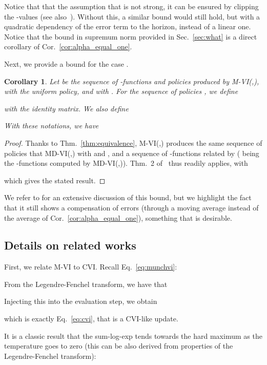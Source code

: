 \documentclass{article}
\newtheorem{cor}{Corollary}
\begin{document}
Notice that that the assumption that  is not strong, it can be ensured by clipping the -values (see also~\cite[Rk.~1]{vieillard2020leverage}). Without this, a similar bound would still hold, but with a quadratic dependency of the error term to the horizon, instead of a linear one. Notice that the bound in supremum norm provided in Sec.~\ref{sec:what} is a direct corollary of Cor.~\ref{cor:alpha_equal_one}.

Next, we provide a bound for the case .
\begin{cor}
    Let  be the sequence of -functions and policies produced by M-VI(,), with  the uniform policy, and with .
    For the sequence of policies , we define
    
    with  the identity matrix. We also define
    
    With these notations, we have
    
\end{cor}
\begin{proof}
    Thanks to Thm.~\ref{thm:equivalence}, M-VI(,) produces the same sequence of policies that MD-VI(,) with  and , and a sequence of -functions related by  ( being the -functions computed by MD-VI(,)). Thm.~2 of~\citet{vieillard2020leverage} thus readily applies, with
    
    which gives the stated result.
\end{proof}
We refer to \cite[Sec.~4.2]{vieillard2020leverage} for an extensive discussion of this bound, but we highlight the fact that it still shows a compensation of errors (through a moving average instead of the average of Cor.~\ref{cor:alpha_equal_one}), something that is desirable.

\subsection{Details on related works}
\label{subappx:related_works}

First, we relate M-VI to CVI. Recall Eq.~\eqref{eq:munchvi}:

From the Legendre-Fenchel transform, we have that

Injecting this into the evaluation step, we obtain

which is exactly Eq.~\eqref{eq:cvi}, that is a CVI-like update.

It is a classic result that the sum-log-exp tends towards the hard maximum as the temperature goes to zero (this can be also derived from properties of the Legendre-Fenchel transform):
\end{document}
